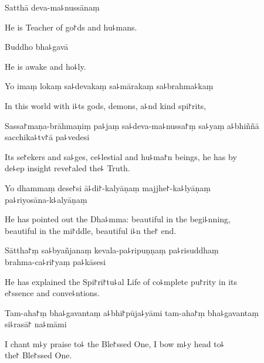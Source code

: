 Satthā deva-ma꜕nussānaṃ

\begin{english}
  He is Teacher of go꜓ds and hu꜕mans.
\end{english}

Buddho bha꜕gavā

\begin{english}
  He is awake and ho꜕ly.
\end{english}

Yo imaṃ lokaṃ sa꜕devakaṃ sa꜕mārakaṃ sa꜕brahma꜕kaṃ

\begin{english}
  In this world with i꜕ts gods, demons, a꜕nd kind spi꜓rits,
\end{english}

Sassa꜓maṇa-brāhmaṇiṃ pa꜕jaṃ sa꜕deva-ma꜕nussa꜓ṃ sa꜕yaṃ a꜕bhiññā sacchika꜕tv꜓ā pa꜕vedesi

\begin{english}
  Its se꜓ekers and sa꜕ges, ce꜕lestial and hu꜕ma꜓n beings, he has by \\de꜕ep insight reve꜓aled the꜕ Truth.
\end{english}

Yo dhammaṃ dese꜓si ā꜕di꜓-kalyāṇaṃ majjhe꜓-ka꜕lyāṇaṃ \\pa꜕riyosāna-k꜕alyāṇaṃ

\begin{english}
  He has pointed out the Dha꜕mma: beautiful in the begi꜕nning, \\beautiful in the mi꜓ddle, beautiful i꜕n the꜓ end.
\end{english}

Sāttha꜓ṃ sa꜕byañjanaṃ kevala-pa꜕ripuṇṇaṃ pa꜕risuddhaṃ \\brahma-ca꜕ri꜓yaṃ pa꜕kāsesi

\begin{english}
  He has explained the Spi꜓ri꜓tu꜕al Life of co꜕mplete pu꜓rity in its \\e꜓ssence and conve꜕ntions.
\end{english}

Tam-aha꜓ṃ bha꜕gavantaṃ a꜕bhi꜓pūja꜕yāmi tam-aha꜓ṃ bha꜕gavantaṃ \\si꜕rasā꜓ na꜕māmi

\begin{english}
  I chant m꜕y praise to꜕ the Ble꜓ssed One, I bow m꜕y head to꜕ \\the꜓ Ble꜓ssed One.
\end{english}

\clearpage

